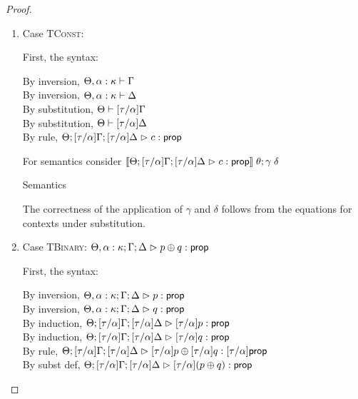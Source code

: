 \begin{proof}
\begin{enumerate}
\item Case \textsc{TConst}:

  First, the syntax: 
  \begin{tabbedproof}
    \oo By inversion, $\judgectx{\Theta, \alpha:\kappa}{\Gamma}$ \\
    \oo By inversion, $\judgectx{\Theta, \alpha:\kappa}{\Delta}$ \\
    \oo By substitution, $\judgectx{\Theta}{[\tau/\alpha]\Gamma}$ \\
    \oo By substitution, $\judgectx{\Theta}{[\tau/\alpha]\Delta}$ \\
    \oo By rule, $\judgeA[\Theta; {[\tau/\alpha]}\Gamma; {[\tau/\alpha]}\Delta]{c}{\assert}$
  \end{tabbedproof}

  For semantics consider $\interp{\judgeA[\Theta; {[\tau/\alpha]}\Gamma; {[\tau/\alpha]}\Delta]{c}{\assert}}\;\theta;\gamma\;\delta$ 
  \begin{eqnproof}
          {Semantics}
  \end{eqnproof}
  The correctness of the application of $\gamma$ and $\delta$ follows from the equations for contexts
  under substitution. 

\item Case \textsc{TBinary}: $\judgeA[\Theta, \alpha:\kappa; \Gamma; \Delta]{p \oplus q}{\assert}$
  
  First, the syntax:
  \begin{tabbedproof}
    \oo By inversion, $\judgeA[\Theta, \alpha:\kappa; \Gamma; \Delta]{p}{\assert}$\\
    \oo By inversion, $\judgeA[\Theta, \alpha:\kappa; \Gamma; \Delta]{q}{\assert}$\\
    \oo By induction, $\judgeA[\Theta; {[\tau/\alpha]}\Gamma; {[\tau/\alpha]}\Delta]{{[\tau/\alpha]}p}{\assert}$\\
    \oo By induction, $\judgeA[\Theta; {[\tau/\alpha]}\Gamma; {[\tau/\alpha]}\Delta]{{[\tau/\alpha]}q}{\assert}$\\
    \oo By rule, $\judgeA[\Theta; {[\tau/\alpha]}\Gamma; {[\tau/\alpha]}\Delta]{{[\tau/\alpha]}p \oplus {[\tau/\alpha]}q}{{[\tau/\alpha]}\assert}$\\
    \oo By subst def, $\judgeA[\Theta; {[\tau/\alpha]}\Gamma; {[\tau/\alpha]}\Delta]{{[\tau/\alpha]}(p \oplus q)}{\assert}$\\
  \end{tabbedproof}


\end{enumerate}
\end{proof}
